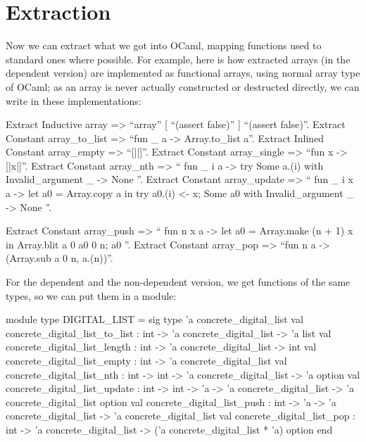 \documentclass{article}
\begin{document}
\section{Extraction}

Now we can extract what we got into OCaml, mapping functions used to standard ones where possible. For example, here is how extracted arrays (in the dependent version) are implemented as functional arrays, using normal array type of OCaml; as an array is never actually constructed or destructed directly, we can write  in these implementations:

\begin{coq}
Extract Inductive array => ``array'' [ ``(assert false)'' ] ``(assert false)''.
Extract Constant array_to_list => ``fun _ a -> Array.to_list a''.
Extract Inlined Constant array_empty => ``[||]''.
Extract Constant array_single => ``fun x -> [|x|]''.
Extract Constant array_nth => ``
  fun _ i a ->
    try Some a.(i)
    with Invalid_argument _ -> None
''.
Extract Constant array_update => ``
  fun _ i x a ->
    let a0 = Array.copy a in
    try
      a0.(i) <- x;
      Some a0
    with Invalid_argument _ -> None
''.
\end{coq}
\pagebreak%
\begin{coq}
Extract Constant array_push => ``
  fun n x a ->
    let a0 = Array.make (n + 1) x in
    Array.blit a 0 a0 0 n;
    a0
''.
Extract Constant array_pop => ``fun n a -> (Array.sub a 0 n, a.(n))''.
\end{coq}

For the dependent and the non-dependent version, we get functions of the same types, so we can put them in a module:

\begin{coq}
module type DIGITAL_LIST = sig
  type 'a concrete_digital_list
  val concrete_digital_list_to_list : int -> 'a concrete_digital_list -> 'a list
  val concrete_digital_list_length : int -> 'a concrete_digital_list -> int
  val concrete_digital_list_empty : int -> 'a concrete_digital_list
  val concrete_digital_list_nth : int -> int -> 'a concrete_digital_list -> 'a option
  val concrete_digital_list_update :
    int -> int -> 'a -> 'a concrete_digital_list -> 'a concrete_digital_list option
  val concrete_digital_list_push : int -> 'a -> 'a concrete_digital_list -> 'a concrete_digital_list
  val concrete_digital_list_pop : int -> 'a concrete_digital_list -> ('a concrete_digital_list * 'a) option
end
\end{coq}
\end{document}
